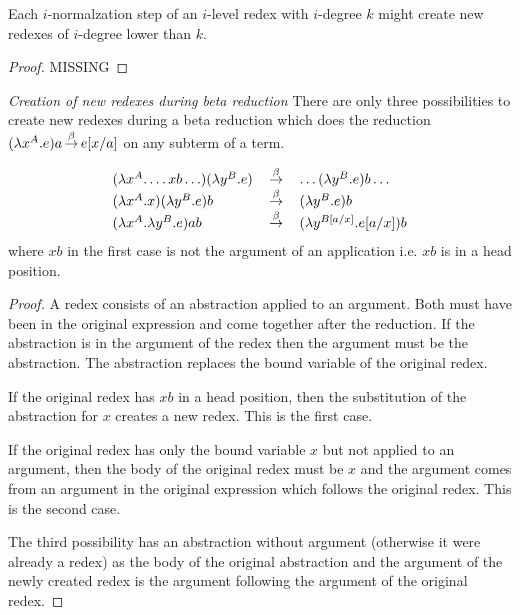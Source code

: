 \begin{theorem}
    Each $i$-normalzation step of an $i$-level redex with $i$-degree $k$ might
    create new redexes of $i$-degree lower than $k$.
    \label{thm:INormalizationDecreasesDegree}

    \begin{proof}
        MISSING
    \end{proof}
\end{theorem}












\begin{theorem}
    \label{thm:NewRedexCreation}
    \emph{Creation of new redexes during beta reduction} There are only three
    possibilities to create new redexes during a beta reduction which does the
    reduction $(\lambda x^A.e) a \reduce \sub a x e$ on any subterm of a term.

    $$
    \begin{array}{lll}
        (\lambda x^A. \ldots xb \ldots) (\lambda y^B. e)
        &\reduce&
        \ldots (\lambda y^B.e) b \ldots
        \\
        (\lambda x^A. x)(\lambda y^B. e) b
        &\reduce&
        (\lambda y^B. e) b
        \\
        (\lambda x^A . \lambda y^B. e) a b
        &\reduce&
        (\lambda y^{B[a/x]}. e[a/x]) b
    \end{array}
    $$
    where $xb$ in the first case is not the argument of an application i.e. $xb$
    is in a head position.

    \begin{proof}
        A redex consists of an abstraction applied to an argument. Both must
        have been in the original expression and come together after the
        reduction. If the abstraction is in the argument of the redex then the
        argument must be the abstraction. The abstraction replaces the bound
        variable of the original redex.

        If the original redex has $x b$ in a head position, then the
        substitution of the abstraction for $x$ creates a new redex. This is the
        first case.

        If the original redex has only the bound variable $x$ but not applied to
        an argument, then the body of the original redex must be $x$ and the
        argument comes from an argument in the original expression which follows
        the original redex. This is the second case.

        The third possibility has an abstraction without argument (otherwise it
        were already a redex) as the body of the original abstraction and the
        argument of the newly created redex is the argument following the
        argument of the original redex.
    \end{proof}
\end{theorem}



